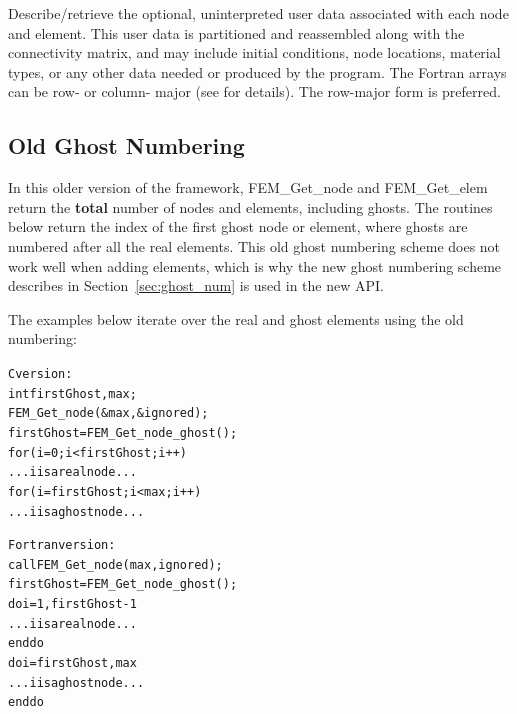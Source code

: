 
     Describe/retrieve the optional, uninterpreted user data associated with
each node and element.  This user data is partitioned and reassembled along
with the connectivity matrix, and may include initial conditions, node locations,
material types, or any other data needed or produced by the program.   The Fortran
arrays can be row- or column- major (see  for
details).  The row-major form is preferred.



\subsection{Old Ghost Numbering}

In this older version of the framework, FEM\_Get\_node and FEM\_Get\_elem return the 
\textbf{total} number of nodes and elements, including ghosts. The routines below
return the index of the first ghost node or element, where ghosts are numbered
after all the real elements.  This old ghost numbering scheme does not work
well when adding elements, which is why the new ghost numbering scheme
describes in Section~\ref{sec:ghost_num} is used in the new API.



The examples below iterate over the real and ghost elements using the old numbering:
\begin{alltt}
C version:
        int firstGhost,max;
        FEM\_Get\_node(\&max, \&ignored);
        firstGhost=FEM\_Get\_node\_ghost();
        for (i=0;i<firstGhost;i++)
                ... i is a real node...
        for (i=firstGhost;i<max;i++)
                ... i is a ghost node ...

Fortran version:
        call FEM\_Get\_node(max,ignored);
        firstGhost=FEM\_Get\_node\_ghost();
        do i=1,firstGhost-1
                ... i is a real node...
        end do
        do i=firstGhost,max
                ... i is a ghost node...
        end do
\end{alltt}



